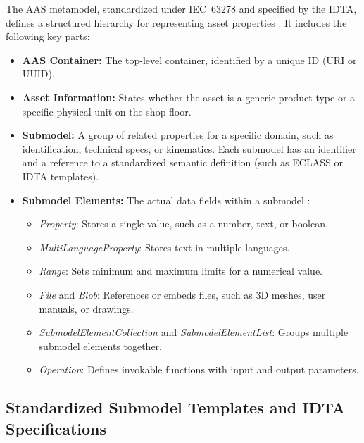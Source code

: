 The \gls{AAS} metamodel, standardized under \gls{IEC}~63278 and specified by the \gls{IDTA}, defines a structured hierarchy for representing asset properties \cite{Pajpach2025,Reichardt2024}. It includes the following key parts:
\begin{itemize}
    \item \textbf{\gls{AAS} Container:} The top-level container, identified by a unique ID (\gls{URI} or \gls{UUID}).
    \item \textbf{Asset Information:} States whether the asset is a generic product type or a specific physical unit on the shop floor.
    \item \textbf{Submodel:} A group of related properties for a specific domain, such as identification, technical specs, or kinematics. Each submodel has an identifier and a reference to a standardized semantic definition (such as \gls{ECLASS} or \gls{IDTA} templates).
    \item \textbf{Submodel Elements:} The actual data fields within a submodel \cite{Reichardt2024,Barnard2024}:
    \begin{itemize}
        \item \textit{Property}: Stores a single value, such as a number, text, or boolean.
        \item \textit{MultiLanguageProperty}: Stores text in multiple languages.
        \item \textit{Range}: Sets minimum and maximum limits for a numerical value.
        \item \textit{File} and \textit{Blob}: References or embeds files, such as 3D meshes, user manuals, or drawings.
        \item \textit{SubmodelElementCollection} and \textit{SubmodelElementList}: Groups multiple submodel elements together.
        \item \textit{Operation}: Defines invokable functions with input and output parameters.
    \end{itemize}
\end{itemize}

\subsection{Standardized Submodel Templates and \texorpdfstring{\gls{IDTA}}{IDTA} Specifications}

